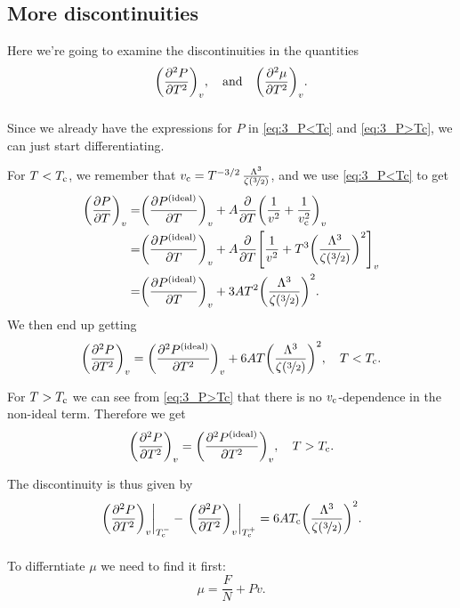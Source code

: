 \documentclass[11pt,letter, swedish, english
]{article}
\begin{document}
\subsection{More discontinuities}
Here we're going to examine the discontinuities in the quantities
\begin{equation}
\qty(\pdv[2]{P}{T})_v \qcomma\text{and}\quad
\qty(\pdv[2]{\mu}{T})_v.
\end{equation}

\subsubsection{}
Since we already have the expressions for $P$ in \eqref{eq:3_P<Tc} and
\eqref{eq:3_P>Tc}, we can just start differentiating.

For $T<T_{\text{c}}$, we remember that
$v_{\text{c}}=T^{-3/2}\,\frac{\Lambda^3}{\zeta(\nicefrac{3}{2})}$, and we use
\eqref{eq:3_P<Tc} to get
\begin{equation}
\begin{aligned}
\qty(\pdv{P}{T})_v=&\qty(\pdv{P^\text{{(ideal)}}}{T})_v
+A\pdv{T}\qty(\frac{1}{v^2}+\frac{1}{v_{\text{c}}^2})_v\\
=&\qty(\pdv{P^\text{{(ideal)}}}{T})_v
+A\pdv{T}\qty[\frac{1}{v^2}+T^3\qty(\frac{\Lambda^3}{\zeta(\nicefrac{3}{2})})^2]_v\\
=&\qty(\pdv{P^\text{{(ideal)}}}{T})_v
+3AT^2\qty(\frac{\Lambda^3}{\zeta(\nicefrac{3}{2})})^2.
\end{aligned}
\end{equation}
We then end up getting
\begin{equation}
\qty(\pdv[2]{P}{T})_v=\qty(\pdv[2]{\ideal{P}}{T})_v
+6AT\qty(\frac{\Lambda^3}{\zeta(\nicefrac{3}{2})})^2
\qcomma T<\Tc.
\end{equation}

For $T>T_{\text{c}}$ we can see from \eqref{eq:3_P>Tc} that there is no
$v_{\text{c}}$-dependence in the non-ideal term. Therefore we get
\begin{equation}
\qty(\pdv[2]{P}{T})_v=\qty(\pdv[2]{\ideal{P}}{T})_v
\qcomma T>\Tc.
\end{equation}

The discontinuity is thus given by
\begin{equation}\label{eq:3_discont._P}
\eval{\qty(\pdv[2]{P}{T})_v}_{\Tc^-}
-\eval{\qty(\pdv[2]{P}{T})_v}_{\Tc^+}
=6A\Tc\qty(\frac{\Lambda^3}{\zeta(\nicefrac{3}{2})})^2.
\end{equation}

\subsubsection{}
To differntiate $\mu$ we need to find it first:
\begin{equation}
\mu=\frac{F}{N}+Pv.
\end{equation}
\end{document}
